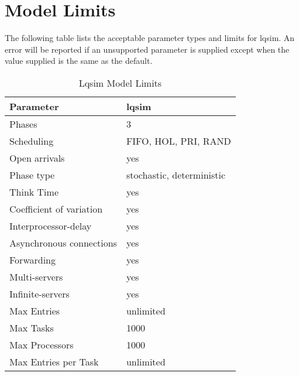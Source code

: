 \section{Model Limits}
\label{sec:lqsim-model-limits}

The following table lists the acceptable parameter types and limits
for lqsim.  An error will be reported if an unsupported parameter is
supplied except when the value supplied is the same as the default.

\begin{table}[htbp]
  \centering
  \begin{tabular}[c]{ll}
    Parameter&lqsim \\
    \hline
    Phases\index{phase!maximum} & 3 \\
    Scheduling\index{scheduling} & FIFO, HOL, PRI, RAND\index{scheduling!fifo}\index{scheduling!hol}\index{scheduling!pri}\index{scheduling!rand} \\
    Open arrivals\index{open arrival} & yes \\
    Phase type\index{phase!type} & stochastic, deterministic \\
    Think Time\index{think time}  & yes  \\
    Coefficient of variation\index{coefficient of variation} & yes \\
    Interprocessor-delay\index{interprocessor delay} & yes \\
    Asynchronous connections\index{asynchronous connections} & yes \\
    Forwarding\index{forwarding} & yes \\
    Multi-servers\index{multi-server} & yes \\
    Infinite-servers\index{infinite server} & yes \\
    Max Entries\index{entry!maximum} & unlimited \\
    Max Tasks\index{task!maximum} & 1000 \\
    Max Processors\index{processor!maximum} & 1000 \\
    Max Entries per Task & unlimited \\
  \end{tabular}
  \caption{\label{tab:lqsim-model-limits}Lqsim Model Limits}
\end{table}

